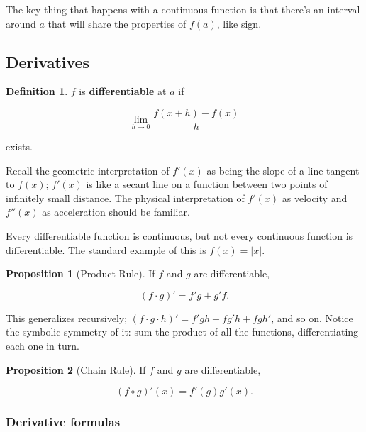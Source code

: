 \documentclass{article}
\theoremstyle{definition}
\newtheorem{definition}{Definition}[section]
\newtheorem{proposition}{Proposition}[section]
\begin{document}
The key thing that happens with a continuous function is that there's an
interval around $a$ that will share the properties of $f(a)$, like sign.

\subsection{Derivatives}

\begin{definition} 
$f$ is \textbf{differentiable} at $a$ if

\begin{equation}
\lim_{h \to 0} \frac{f(x+h) - f(x)}{h}
\end{equation}

exists.
\end{definition}

Recall the geometric interpretation of $f'(x)$ as being the slope of a line
tangent to $f(x)$; $f'(x)$ is like a secant line on a function between two
points of infinitely small distance. The physical interpretation of $f'(x)$ as
velocity and $f''(x)$ as acceleration should be familiar.

Every differentiable function is continuous, but not every continuous function is differentiable. The standard example of this is $f(x) = |x|$.

\begin{proposition}[Product Rule] 

If $f$ and $g$ are differentiable, 

\begin{equation}
(f \cdot g)' = f'g + g'f.
\end{equation}


\end{proposition} 

This generalizes recursively; $(f \cdot g \cdot h)' = f'gh + fg'h + fgh'$, and
so on. Notice the symbolic symmetry of it: sum the product of all the functions,
differentiating each one in turn.

\begin{proposition}[Chain Rule]

If $f$ and $g$ are differentiable,

\begin{equation}
(f \circ g)'(x) = f'(g)g'(x).
\end{equation}


\end{proposition}

\subsubsection{Derivative formulas}
\end{document}
